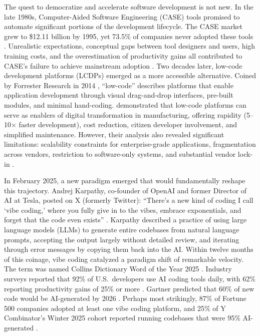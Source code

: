 \documentclass[preprint,12pt,authoryear]{elsarticle}
\begin{document}
The quest to democratize and accelerate software development is not new. In the late 1980s, Computer-Aided Software Engineering (CASE) tools promised to automate significant portions of the development lifecycle. The CASE market grew to \$12.11 billion by 1995, yet 73.5\% of companies never adopted these tools \citep{IDC1996, Iivari1996}. Unrealistic expectations, conceptual gaps between tool designers and users, high training costs, and the overestimation of productivity gains all contributed to CASE's failure to achieve mainstream adoption \citep{Iivari1996, Huff1992}. Two decades later, low-code development platforms (LCDPs) emerged as a more accessible alternative. Coined by Forrester Research in 2014 \citep{Richardson2014}, ``low-code'' describes platforms that enable application development through visual drag-and-drop interfaces, pre-built modules, and minimal hand-coding. \citet{Sanchis2020} demonstrated that low-code platforms can serve as enablers of digital transformation in manufacturing, offering rapidity (5--10$\times$ faster development), cost reduction, citizen developer involvement, and simplified maintenance. However, their analysis also revealed significant limitations: scalability constraints for enterprise-grade applications, fragmentation across vendors, restriction to software-only systems, and substantial vendor lock-in \citep{Sanchis2020, Tisi2019}.

In February 2025, a new paradigm emerged that would fundamentally reshape this trajectory. Andrej Karpathy, co-founder of OpenAI and former Director of AI at Tesla, posted on X (formerly Twitter): ``There's a new kind of coding I call `vibe coding,' where you fully give in to the vibes, embrace exponentials, and forget that the code even exists'' \citep{Karpathy2025}. Karpathy described a practice of using large language models (LLMs) to generate entire codebases from natural language prompts, accepting the output largely without detailed review, and iterating through error messages by copying them back into the AI. Within twelve months of this coinage, vibe coding catalyzed a paradigm shift of remarkable velocity. The term was named Collins Dictionary Word of the Year 2025 \citep{Collins2025}. Industry surveys reported that 92\% of U.S.\ developers use AI coding tools daily, with 62\% reporting productivity gains of 25\% or more \citep{StackOverflow2025}. Gartner predicted that 60\% of new code would be AI-generated by 2026 \citep{Gartner2025}. Perhaps most strikingly, 87\% of Fortune 500 companies adopted at least one vibe coding platform, and 25\% of Y Combinator's Winter 2025 cohort reported running codebases that were 95\% AI-generated \citep{Shmargad2025, YCombinator2025}.
\end{document}
